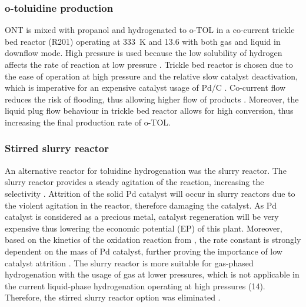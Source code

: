 \subsubsection{o-toluidine production}

ONT is mixed with propanol and hydrogenated to o-TOL in a co-current trickle bed reactor (R201) operating at \SI{333}{\K} and \SI{13.6}{\atm} with both gas and liquid in downflow mode. High pressure is used because the low solubility of hydrogen affects the rate of reaction at low pressure \cite{rajadhyaksha_solvent_1986}. Trickle bed reactor is chosen due to the ease of operation at high pressure and the relative slow catalyst deactivation, which is imperative for an expensive catalyst usage of Pd/C \cite{vemala_hydrodynamic_nodate}. Co-current flow reduces the risk of flooding, thus allowing higher flow of products \cite{vemala_hydrodynamic_nodate}. Moreover, the liquid plug flow behaviour in trickle bed reactor allows for high conversion, thus increasing the final production rate of o-TOL. 

\subsubsection{Stirred slurry reactor}
An alternative reactor for toluidine hydrogenation was the slurry reactor. The slurry reactor provides a steady agitation of the reaction, increasing the selectivity \cite{p_a_ramachandran_recent_1987}. Attrition of the solid Pd catalyst will occur in slurry reactors due to the violent agitation in the reactor, therefore damaging the catalyst. As Pd catalyst is considered as a precious metal, catalyst regeneration will be very expensive thus lowering the economic potential (EP) of this plant. Moreover, based on the kinetics of the oxidation reaction from  , the rate constant is strongly dependent on the mass of Pd catalyst, further proving the importance of low catalyst attrition \cite{rajadhyaksha_solvent_1986}.
The slurry reactor is more suitable for gas-phased hydrogenation with the usage of  gas at lower pressures, which is not applicable in the current liquid-phase hydrogenation operating at high pressures (\SI{14}{\atm}). Therefore, the stirred slurry reactor option was eliminated \cite{ranade_chapter_2011}.


